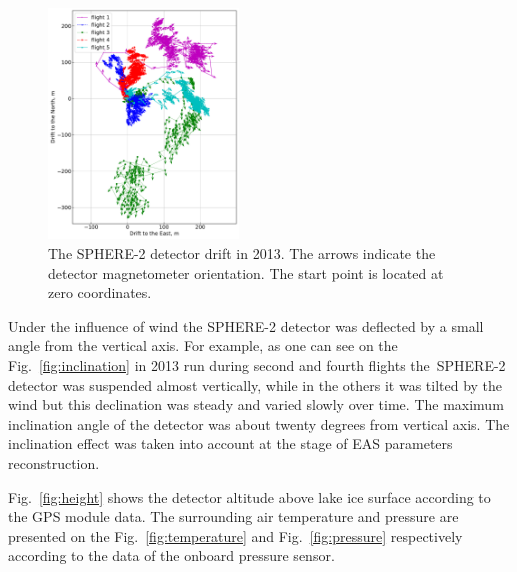 \documentclass[final,5p,times,twocolumn]{elsarticle}
\begin{document}
\begin{figure}[tb]
    \includegraphics[width=0.45\textwidth]{figs/GPS+quiver.pdf}\hspace{2pc}%
    \caption{The SPHERE-2 detector drift in 2013. The arrows indicate the detector magnetometer orientation. The start point is located at zero coordinates.}
\label{fig:gps_compass}
\end{figure}

Under the influence of wind the SPHERE-2 detector was deflected by a small angle from the vertical axis. For example, as one can see on the Fig.~\ref{fig:inclination} in 2013 run during second and fourth flights the~\mbox{SPHERE-2} detector was suspended almost vertically, while in the others it was tilted by the wind but this declination was steady and varied slowly over time. The maximum inclination angle of the detector was about twenty degrees from vertical axis. The inclination effect was taken into account at the stage of EAS parameters reconstruction.

Fig.~\ref{fig:height} shows the detector altitude above lake ice surface according to the GPS module data. The surrounding air temperature and pressure are presented on the Fig.~\ref{fig:temperature} and Fig.~\ref{fig:pressure} respectively according to the data of the onboard pressure sensor.
\end{document}
